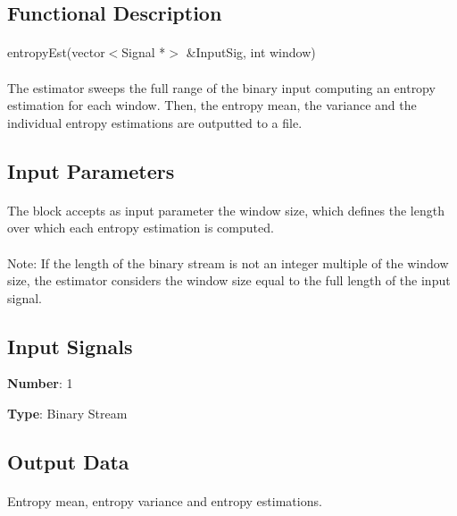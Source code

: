 \subsection*{Functional Description}
\paragraph{}
entropyEst(vector$<$Signal *$>$ \&InputSig, int window)
\paragraph{}
The estimator sweeps the full range of the binary input computing an entropy estimation for each window. Then, the entropy mean, the variance and the individual entropy estimations are outputted to a file.

\subsection*{Input Parameters}
\paragraph{}
The block accepts as input parameter the window size, which defines the length over which each entropy estimation is computed.

\paragraph{}
Note: If the length of the binary stream is not an integer multiple of the window size, the estimator considers the window size equal to the full length of the input signal.


\subsection*{Input Signals}

\textbf{Number}: 1

\textbf{Type}: Binary Stream

\subsection*{Output Data}
\paragraph{}
Entropy mean, entropy variance and entropy estimations.

\paragraph{}

